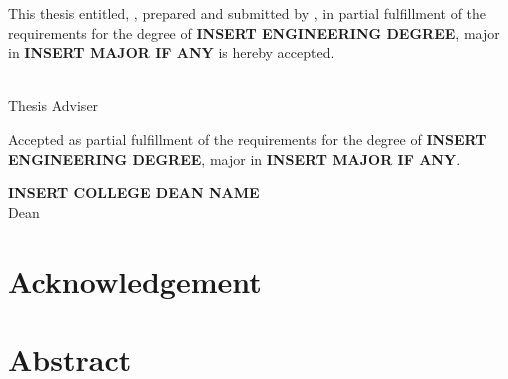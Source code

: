 \begin{singlespace}
This thesis entitled, \textbf{\MakeUppercase \thesistitle}, prepared and submitted by \textbf{\MakeUppercase \authorname}, in partial fulfillment of the requirements for the degree of \textbf{INSERT ENGINEERING DEGREE}, major in \textbf{INSERT MAJOR IF ANY} is hereby accepted.
\end{singlespace}

\vspace*{1cm}

\begin{singlespace}
	{\noindent\hspace*{7cm}\textbf{\MakeUppercase \advisername}}\\
	{\hspace*{9.2cm}Thesis Adviser}
\end{singlespace}

\vspace*{6cm}

\begin{singlespace}
Accepted as partial fulfillment of the requirements for the degree of \textbf{INSERT ENGINEERING DEGREE}, major in \textbf{INSERT MAJOR IF ANY}.
\end{singlespace}

\vspace*{1cm}

\begin{singlespace}
	{\noindent\hspace*{7.4cm}\textbf{\MakeUppercase {INSERT COLLEGE DEAN NAME}}}\\
	{\hspace*{10.1cm}Dean}
\end{singlespace}


\newpage
\thispagestyle{empty}
\chapter*{Acknowledgement}



\newpage
\thispagestyle{empty}
\chapter*{Abstract}

